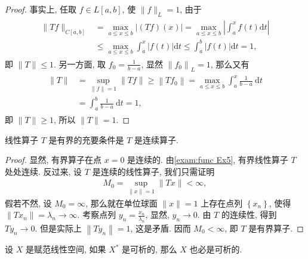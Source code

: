 \begin{proof}
    事实上, 任取 $f \in L[a, b]$, 使 $\|f\|_L=1$, 由于
\begin{align*}
\begin{aligned}
\|T f\|_{C[a, b]} & =\max _{a \leqslant x \leqslant b}|(T f)(x)|=\max _{a \leqslant x \leqslant b}\left|\int_a^x f(t) \mathrm{d} t\right| \\
& \leqslant \max _{a \leqslant x \leqslant b} \int_a^x|f(t)| \mathrm{d} t \leqslant \int_a^b|f(t)| \mathrm{d} t=1,
\end{aligned}
\end{align*}
即 $\|T\| \leqslant 1$. 另一方面, 取 $f_0=\frac{1}{b-a}$, 显然 $\left\|f_0\right\|_L=1$, 那么又有
\begin{align*}
\begin{aligned}
\|T\| & =\sup _{\|f\|=1}\|T f\| \geqslant\left\|T f_0\right\|=\max _{a \leqslant x \leqslant b} \int_a^x \frac{1}{b-a} \mathrm{~d} t \\
& =\int_a^b \frac{1}{b-a} \mathrm{~d} t=1,
\end{aligned}
\end{align*}
即 $\|T\| \geqslant 1$, 所以 $\|T\|=1$.
\end{proof}

\begin{example}
    线性算子 $T$ 是有界的充要条件是 $T$ 是连续算子.
\end{example}

\begin{proof}
    显然, 有界算子在点 $x=0$ 是连续的. 由\autoref{exam:func Ex5}, 有界线性算子 $T$ 处处连续.
反过来, 设 $T$ 是连续的线性算子, 我们只需证明
\begin{align*}
M_0=\sup _{\|x\|=1}\|T x\|<\infty,
\end{align*}
假若不然, 设 $M_0=\infty$, 那么就在单位球面 $\|x\|=1$ 上存在点列 $\left\{x_n\right\}$, 使得 $\left\|T x_n\right\|=\lambda_n \rightarrow \infty$. 考察点列 $y_n=\frac{x_n}{\lambda_n}$, 显然, $y_n \rightarrow 0$. 由 $T$ 的连续性, 得到 $T y_n \rightarrow 0$. 但是实际上 $\left\|T y_n\right\|=1$, 这是矛盾. 因而 $M_0<\infty$, 即 $T$ 是有界算子.
\end{proof}


\begin{example}
    设 $X$ 是赋范线性空间, 如果 $X^*$ 是可析的, 那么 $X$ 也必是可析的.
\end{example}

